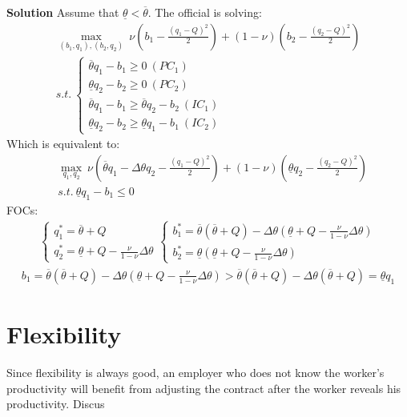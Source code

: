 \documentclass[a4paper]{article}
\newcommand{\ubar}{\overline}
\newcommand{\lbar}{\underline}
\begin{document}
	
	\textbf{Solution}
	Assume that $\lbar{\theta} < \ubar{\theta}$. The official is solving:
	\begin{align*}
	\underset{(b_1, q_1), (b_2, q_2)}{\max}\ \nu\left(b_1 - \frac{(q_1 - Q)^2}{2}\right) + (1 - \nu) \left(b_2 - \frac{(q_2 - Q)^2}{2}\right)\\
	s.t.\ \begin{cases}
	\ubar{\theta}q_1 - b_1 \ge 0\ (PC_1)\\
	\lbar{\theta}q_2 - b_2 \ge 0\ (PC_2)\\
	\ubar{\theta}q_1 - b_1 \ge \ubar{\theta}q_2 - b_2\ (IC_1)\\
	\lbar{\theta} q_2 - b_2 \ge \lbar{\theta}q_1 - b_1\ (IC_2)
	\end{cases}
	\end{align*}
	Which is equivalent to:
	\begin{align*}
	&\underset{q_1, q_2}{\max}\ \nu \left(\ubar{\theta}q_1 - \Delta \theta q_2 - \frac{(q_1 - Q)^2}{2}\right) + (1 - \nu) \left(\lbar{\theta}q_2 -\frac{(q_2 - Q)^2}{2}\right) \\
	&s.t.\ \lbar{\theta}q_1 - b_1 \le 0
	\end{align*}
	FOCs:
	\begin{align*}
	\begin{cases}
	q_1^* = \ubar{\theta} + Q\\
	q_2^* = \lbar{\theta} + Q - \frac{\nu}{1 - \nu} \Delta \theta	
	\end{cases} \begin{cases}
	b_1^* = \ubar{\theta}(\ubar{\theta} + Q) - \Delta \theta (\lbar{\theta} +Q - \frac{\nu}{1 - \nu} \Delta \theta)\\
	b_2^* = \lbar{\theta}(\lbar{\theta} +Q - \frac{\nu}{1 - \nu} \Delta \theta)
	\end{cases}
	\end{align*}
	\begin{align*}
	b_1 = \ubar{\theta}(\ubar{\theta} + Q) - \Delta \theta (\lbar{\theta} +Q - \frac{\nu}{1 - \nu} \Delta \theta) > \ubar{\theta}(\ubar{\theta} + Q) - \Delta \theta (\ubar{\theta} + Q) = \lbar{\theta} q_1
	\end{align*}
	
	\section*{Flexibility}
		Since flexibility is always good, an employer who does not know the worker's productivity
		will benefit from adjusting the contract after the worker reveals his productivity. Discus
		
\end{document}
